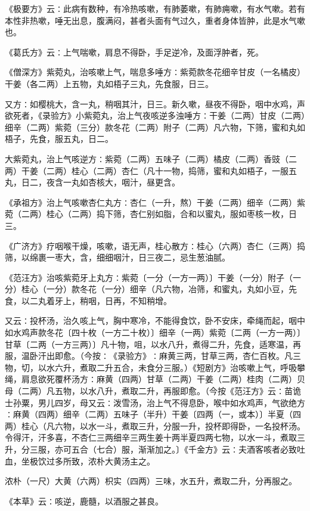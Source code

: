 \documentclass[a4paper,12pt,UTF8,twoside]{ctexbook}
\begin{document}
《极要方》云∶此病有数种，有冷热咳嗽，有肺萎嗽，有肺痈嗽，有水气嗽。若有本性非热嗽，唾无出息，腹满闷，甚者头面有气过久，重者身体皆肿，此是水气嗽也。

《葛氏方》云∶上气喘嗽，肩息不得卧，手足逆冷，及面浮肿者，死。

《僧深方》紫菀丸，治咳嗽上气，喘息多唾方∶紫菀款冬花细辛甘皮（一名橘皮）干姜（各二两）上五物，丸如梧子三丸，先食服，日三。

又方∶如樱桃大，含一丸，稍咽其汁，日三。新久嗽，昼夜不得卧，咽中水鸡，声欲死者，《录验方》小紫菀丸，治上气夜咳逆多浊唾方∶干姜（二两）甘皮（二两）细辛（二两）紫菀（三分）款冬花（二两）附子（二两）凡六物，下筛，蜜和丸如梧子，先食，服五丸，日二。

大紫菀丸，治上气咳逆方∶紫菀（二两）五味子（二两）橘皮（二两）香豉（二两）干姜（二两）桂心（二两）杏仁（凡十一物，捣筛，蜜和丸如梧子，一服五丸，日二，夜含一丸如杏核大，咽汁，昼更含。

《承祖方》治上气咳嗽杏仁丸方∶杏仁（一升，熬）干姜（二两）细辛（二两）紫菀（二两）桂心（二两）捣下筛，杏仁别如脂，合和以蜜丸，服如枣核一枚，日三。

《广济方》疗咽喉干燥，咳嗽，语无声，桂心散方∶桂心（六两）杏仁（三两）捣筛，以绵裹一枣大，含，细细咽汁，日三夜二，忌生葱油腻。

《范汪方》治咳紫菀牙上丸方∶紫菀〔一分（一方一两）〕干姜（一分）附子（一分）桂心（一分）款冬花（一分）细辛（凡六物，冶筛，和蜜丸，丸如小豆，先食，以二丸着牙上，稍咽，日再，不知稍增。

又云∶投杯汤，治久咳上气，胸中寒冷，不能得食饮，卧不安床，牵绳而起，咽中如水鸡声款冬花〔四十枚（一方二十枚）〕细辛（一两）紫菀〔二两（一方一两）〕甘草〔二两（一方三两）〕凡十物，咀，以水八升，煮得二升，先食，适寒温，再服，温卧汗出即愈。（今按∶《录验方》∶麻黄三两，甘草三两，杏仁百枚。凡三物，切，以水六升，煮取二升五合，未食分三服。）《短剧方》治咳嗽上气，呼吸攀绳，肩息欲死覆杯汤方∶麻黄（四两）甘草（二两）干姜（二两）桂肉（二两）贝母（二两）凡五物，以水八升，煮取二升，再服即愈。（今按《范汪方》云∶苗诡士孙粟，男儿四岁，母又云∶泼雪汤，治上气不得息卧，喉中如水鸡声，气欲绝方∶麻黄（四两）细辛（二两）五味子（半升）干姜〔四两（一，或本）〕半夏（四两）桂心（凡六物，以水一斗，煮取三升，分服一升，投杯即得卧，一名投杯汤。令得汗，汗多喜，不杏仁三两细辛三两生姜十两半夏四两七物，以水一斗，煮取三升，分三服，亦可五合（七合）服，渐渐加之。〕《千金方》云∶夫酒客咳者必致吐血，坐极饮过多所致，浓朴大黄汤主之。

浓朴（一尺）大黄（六两）枳实（四两）三味，水五升，煮取二升，分再服之。

《本草》云∶咳逆，鹿髓，以酒服之甚良。
\end{document}
